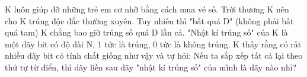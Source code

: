 K luôn giúp đỡ những trẻ em cơ nhỡ bằng cách mua vé số. Trời thương K  nên cho K trúng độc đắc thường xuyên. Tuy nhiên thì "bất quá D" (không  phải bất quá tam) K chẳng bao giờ trúng số quá D lần cả. "Nhật kí trúng  số" của K là một dãy bit có độ dài N, 1 tức là trúng, 0 tức là không  trúng. K thấy rằng có rất nhiều dãy bit có tính chất giống như vậy và tự  hỏi: Nếu ta sắp xếp tất cả lại theo thứ tự từ điển, thì dãy liền sau  dãy "nhật kí trúng số" của mình là dãy nào nhỉ?